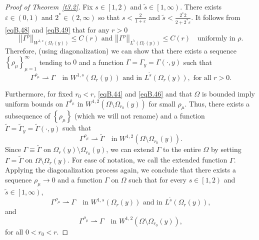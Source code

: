 \documentclass[12pt,reqno]{amsart}
\theoremstyle{plain}
\theoremstyle{definition}
\newenvironment{pf}
{\begin{proof}} {\end{proof}}
\newcommand{\eps}{\varepsilon}
\newcommand{\Ga}{\Gamma}
\newcommand{\Om}{\Omega}
\newcommand{\iny}{\infty}
\newcommand{\norm}[1]{\left\vert \left\vert #1\right\vert\right\vert}
\newcommand{\set}[1]{\left\{#1\right\}}
\newcommand{\pr}[1]{\left( #1 \right) }
\newcommand{\brp}[1]{\left[#1\right)}
\begin{document}
\begin{appendix}
\begin{pf}[Proof of Theorem~\ref{t3.2}]
Fix $s\in \brp{1, 2}$ and $\tilde s\in \brp{1, \iny}$.  
There exists $\eps \in \pr{0, 1}$ and $2^* \in \pr{2, \iny}$ so that $s < \frac{2}{1+\eps}$ and $\tilde s < \frac{2^* 2}{2 + 2^* \eps}$.
It follows from \eqref{eqB.48} and \eqref{eqB.49} that for any $r > 0$
\begin{equation}
\label{eqB.50}
\norm{\Ga^\rho}_{W^{1,s}\pr{\Omega_{r}\pr{y}}} \le C\pr{r} \mbox{ and } \norm{\Ga^\rho}_{L^{\tilde s}\pr{\Omega_{r}\pr{y}}} \le C\pr{r}\quad \text{uniformly in } 
\rho.
\end{equation}
Therefore, (using diagonalization) we can show that there exists a sequence $\set{\rho_\mu}_{\mu=1}^\infty$ tending to $0$ and a function $\Ga =\Ga_{y} = \Ga\pr{\cdot, y}$ such that
\begin{equation}
\label{eqB.51}
\Ga^{\rho_\mu} \rightharpoonup \Ga \quad \text{in } 
W^{1,s}\pr{\Om_{r}\pr{y}} \mbox{ and in } L^{\tilde s} \pr{\Om_{r}\pr{y}}, \mbox{ for all } r > 0.
\end{equation}

Furthermore, for fixed $r_0 < r$, \eqref{eqB.44} and \eqref{eqB.46} and that $\Om$ is bounded imply uniform bounds on $\Ga^{\rho_\mu}$ in $W^{1,2}\pr{\Om \setminus \Om_{r_0}\pr{y}}$ for small $\rho_\mu$.
Thus, there exists a subsequence of $\set{\rho_\mu}$ (which we will not rename)  and a function $\widetilde{\Ga}=\widetilde{\Ga}_{y} = \widetilde {\Ga}\pr{\cdot, y}$ such that
\begin{equation*}
\Ga^{\rho_\mu} \rightharpoonup \widetilde{\Ga} \quad \text{in } W^{1,2}\pr{\Om \setminus \Om_{r_0}\pr{y}}.
\end{equation*}
Since $\Ga \equiv \widetilde{\Ga}$ on $\Om_{r}\pr{y}\setminus \Om_{r_0}\pr{y}$, we can extend $\Ga$ to the entire $\Om$ by setting $\Ga=\widetilde{\Ga}$ on $\Om\setminus \Om_{r}\pr{y}$.  
For ease of notation, we call the extended function $\Ga$.  
Applying the diagonalization process again, we conclude that there exists a sequence $\rho_\mu \to 0$ and a function $\Ga$ on $\Omega$ such that for every $s\in \brp{1, 2}$ and $\tilde s\in \brp{1, \iny}$,
\begin{equation}
\label{eqB.52}
\Ga^{\rho_\mu} \rightharpoonup \Ga \quad \text{in } 
W^{1,s}\pr{\Om_{r}\pr{y}} \mbox{ and in }L^{\tilde s}\pr{\Om_{r}\pr{y}},
\end{equation}
and
\begin{equation}
\label{eqB.53}
\Ga^{\rho_{\mu}} \rightharpoonup \Ga \quad \text{in } W^{1,2}\pr{\Om \setminus 
\Om_{r_0}\pr{y}},
\end{equation}
for all $0 < r_0 < r$.


\end{pf}
\end{appendix}
\end{document}
